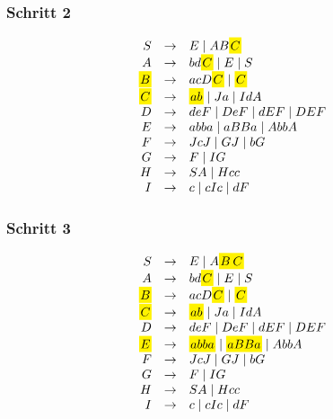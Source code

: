 \documentclass{article}
\begin{document}
\begin{multicols}{2}
   \vfill{ }

   \subsubsection{Schritt 2}
   \begin{equation*}
      \begin{array}{rcl}
         \grule{S}{E \mid AB\marked{C}} \\
         \grule{A}{bd\marked{C} \mid E \mid S} \\
         \grule{\marked{B}}{acD\marked{C} \mid \marked{C}} \\
         \grule{\marked{C}}{\marked{ab} \mid Ja \mid IdA} \\
         \grule{D}{deF \mid DeF \mid dEF \mid DEF} \\
         \grule{E}{abba \mid aBBa \mid AbbA} \\
         \grule{F}{JcJ \mid GJ \mid bG} \\
         \grule{G}{F \mid IG} \\
         \grule{H}{SA \mid Hcc} \\
         \grule{I}{c \mid cIc \mid dF} \\
      \end{array}
   \end{equation*}

   \subsubsection{Schritt 3}

   \begin{equation*}
      \begin{array}{rcl}
         \grule{S}{E \mid A\marked{B}\marked{C}} \\
         \grule{A}{bd\marked{C} \mid E \mid S} \\
         \grule{\marked{B}}{acD\marked{C} \mid \marked{C}} \\
         \grule{\marked{C}}{\marked{ab} \mid Ja \mid IdA} \\
         \grule{D}{deF \mid DeF \mid dEF \mid DEF} \\
         \grule{\marked{E}}{\marked{abba}\mid \marked{aBBa} \mid AbbA} \\
         \grule{F}{JcJ \mid GJ \mid bG} \\
         \grule{G}{F \mid IG} \\
         \grule{H}{SA \mid Hcc} \\
         \grule{I}{c \mid cIc \mid dF} \\
      \end{array}
   \end{equation*}


\end{multicols}
\end{document}
